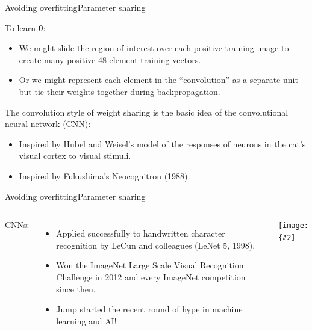 \documentclass{beamer}
\renewcommand{\vec}[1]{\boldsymbol{#1}}
\newcommand{\myfig}[3]{\centerline{\texttt{[image: \{\#2]}}}
\begin{document}
\begin{frame}{Avoiding overfitting}{Parameter sharing}

  To learn $\vec{\theta}$:
  \begin{itemize}
    \item We might \alert{slide} the region of interest over each
      positive training image to create many positive 48-element
      training vectors.
    \item Or we might represent each element in the ``convolution'' as
      a separate unit but \alert{tie} their weights together during
      backpropagation.
  \end{itemize}

  \medskip
  
  The convolution style of weight sharing is the basic idea of the
  \alert{convolutional neural network} (CNN):
  \begin{itemize}
  \item Inspired by Hubel and Weisel's model of the responses of
    neurons in the cat's visual cortex to visual stimuli.
  \item Inspired by Fukushima's Neocognitron (1988).
  \end{itemize}
  
\end{frame}


\begin{frame}{Avoiding overfitting}{Parameter sharing}

  \begin{columns}

    \column{2in}
    
    CNNs:
    \begin{itemize}
    \item Applied successfully to handwritten character recognition by
      LeCun and colleagues (LeNet 5, 1998).
    \item Won the ImageNet Large Scale Visual Recognition Challenge in 2012 and
      every ImageNet competition since then.
    \item Jump started the recent round of hype in machine learning and AI!
    \end{itemize}

    \medskip

    \column{2.5in}
    
    \myfig{2.5in}{gartner-2020}{Gartner hype cycle (2020)}

  \end{columns}
  
\end{frame}
\end{document}
